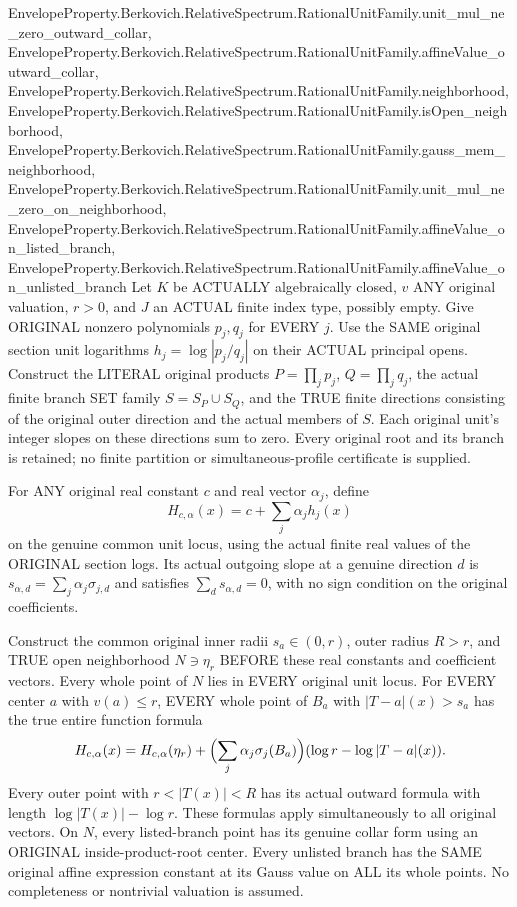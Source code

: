 \begin{theorem}
{EnvelopeProperty.Berkovich.RelativeSpectrum.RationalUnitFamily.unit_mul_ne_zero_outward_collar,
EnvelopeProperty.Berkovich.RelativeSpectrum.RationalUnitFamily.affineValue_outward_collar,
EnvelopeProperty.Berkovich.RelativeSpectrum.RationalUnitFamily.neighborhood,
EnvelopeProperty.Berkovich.RelativeSpectrum.RationalUnitFamily.isOpen_neighborhood,
EnvelopeProperty.Berkovich.RelativeSpectrum.RationalUnitFamily.gauss_mem_neighborhood,
EnvelopeProperty.Berkovich.RelativeSpectrum.RationalUnitFamily.unit_mul_ne_zero_on_neighborhood,
EnvelopeProperty.Berkovich.RelativeSpectrum.RationalUnitFamily.affineValue_on_listed_branch,
EnvelopeProperty.Berkovich.RelativeSpectrum.RationalUnitFamily.affineValue_on_unlisted_branch}
Let $K$ be ACTUALLY algebraically closed, $v$ ANY original valuation,
$r>0$, and $J$ an ACTUAL finite index type, possibly empty. Give ORIGINAL
nonzero polynomials $p_j,q_j$ for EVERY $j$. Use the SAME original section
unit logarithms $h_j=\log|p_j/q_j|$ on their ACTUAL principal opens.
Construct the LITERAL original products $P=\prod_jp_j$, $Q=\prod_jq_j$,
the actual finite branch SET family $S=S_P\cup S_Q$, and the TRUE finite
directions consisting of the original outer direction and the actual
members of $S$. Each original unit's integer slopes on these directions
sum to zero. Every original root and its branch is retained; no finite
partition or simultaneous-profile certificate is supplied.

For ANY original real constant $c$ and real vector $\alpha_j$, define
\[
 H_{c,\alpha}(x)=c+\sum_j\alpha_j h_j(x)
\]
on the genuine common unit locus, using the actual finite real values of
the ORIGINAL section logs. Its actual outgoing slope at a genuine direction
$d$ is $s_{\alpha,d}=\sum_j\alpha_j\sigma_{j,d}$ and satisfies
$\sum_ds_{\alpha,d}=0$, with no sign condition on the original coefficients.

Construct the common original inner radii $s_a\in(0,r)$, outer radius
$R>r$, and TRUE open neighborhood $N\ni\eta_r$ BEFORE these real constants
and coefficient vectors. Every whole point of $N$ lies in EVERY original
unit locus. For EVERY center $a$ with $v(a)\le r$, EVERY whole point of
$B_a$ with $|T-a|(x)>s_a$ has the true entire function formula
\[
 H_{c,\alpha}(x)=H_{c,\alpha}(\eta_r)
   +\Bigl(\sum_j\alpha_j\sigma_j(B_a)\Bigr)
         (\log r-\log|T-a|(x)).
\]
Every outer point with $r<|T(x)|<R$ has its actual outward formula with
length $\log|T(x)|-\log r$. These formulas apply simultaneously to all
original vectors. On $N$, every listed-branch point has its genuine collar
form using an ORIGINAL inside-product-root center. Every unlisted branch
has the SAME original affine expression constant at its Gauss value on
ALL its whole points. No completeness or nontrivial valuation is assumed.
\end{theorem}
